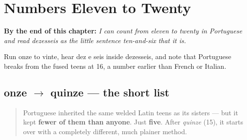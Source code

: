 
\chapter{Numbers Eleven to Twenty}
\label{ch:pt-numbers-eleven-to-twenty}

\begin{chapteropening}
\textbf{By the end of this chapter:} \emph{I can count from eleven to twenty in Portuguese and read dezesseis as the little sentence ten-and-six that it is.}

Run onze to vinte, hear dez e seis inside dezesseis, and note that Portuguese breaks from the fused teens at 16, a number earlier than French or Italian.
\end{chapteropening}

\section[onze — quinze]{onze $\to$ quinze — the short list}

\label{lesson:PT-C12-numeros-11-15}



\begin{quote}
Portuguese inherited the same welded Latin teens as its sisters — but it kept \textbf{fewer of them than anyone}. Just \textbf{five}. After \emph{quinze} (15), it starts over with a completely different, much plainer method.
\end{quote}

